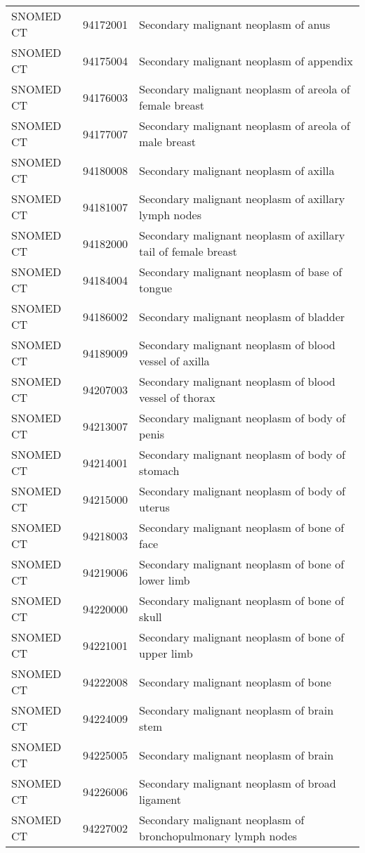 \begin{longtable}{p{}p{}p{}}
  SNOMED CT & 94172001 & Secondary malignant neoplasm of anus \\ 
  SNOMED CT & 94175004 & Secondary malignant neoplasm of appendix \\ 
  SNOMED CT & 94176003 & Secondary malignant neoplasm of areola of female breast \\ 
  SNOMED CT & 94177007 & Secondary malignant neoplasm of areola of male breast \\ 
  SNOMED CT & 94180008 & Secondary malignant neoplasm of axilla \\ 
  SNOMED CT & 94181007 & Secondary malignant neoplasm of axillary lymph nodes \\ 
  SNOMED CT & 94182000 & Secondary malignant neoplasm of axillary tail of female breast \\ 
  SNOMED CT & 94184004 & Secondary malignant neoplasm of base of tongue \\ 
  SNOMED CT & 94186002 & Secondary malignant neoplasm of bladder \\ 
  SNOMED CT & 94189009 & Secondary malignant neoplasm of blood vessel of axilla \\ 
  SNOMED CT & 94207003 & Secondary malignant neoplasm of blood vessel of thorax \\ 
  SNOMED CT & 94213007 & Secondary malignant neoplasm of body of penis \\ 
  SNOMED CT & 94214001 & Secondary malignant neoplasm of body of stomach \\ 
  SNOMED CT & 94215000 & Secondary malignant neoplasm of body of uterus \\ 
  SNOMED CT & 94218003 & Secondary malignant neoplasm of bone of face \\ 
  SNOMED CT & 94219006 & Secondary malignant neoplasm of bone of lower limb \\ 
  SNOMED CT & 94220000 & Secondary malignant neoplasm of bone of skull \\ 
  SNOMED CT & 94221001 & Secondary malignant neoplasm of bone of upper limb \\ 
  SNOMED CT & 94222008 & Secondary malignant neoplasm of bone \\ 
  SNOMED CT & 94224009 & Secondary malignant neoplasm of brain stem \\ 
  SNOMED CT & 94225005 & Secondary malignant neoplasm of brain \\ 
  SNOMED CT & 94226006 & Secondary malignant neoplasm of broad ligament \\ 
  SNOMED CT & 94227002 & Secondary malignant neoplasm of bronchopulmonary lymph nodes \\ 

\end{longtable}
